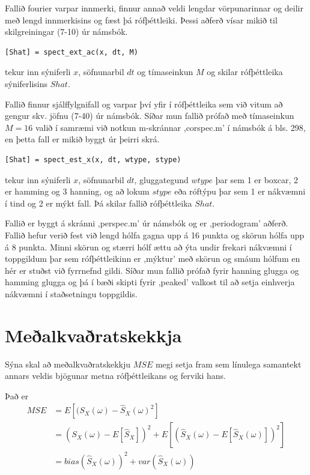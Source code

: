 \documentclass[11pt,a4paper]{article}
\begin{document}
Fallið fourier varpar innmerki, finnur annað veldi lengdar vörpunarinnar og deilir með lengd
innmerkisins og fæst þá rófþéttleiki. Þessi aðferð vísar mikið til skilgreiningar (7-10) úr námsbók.

\begin{verbatim}
[Shat] = spect_ext_ac(x, dt, M)
\end{verbatim}
tekur inn sýniferli $x$, söfnunarbil $dt$ og tímaseinkun $M$ og skilar
rófþéttleika sýniferlisins $Shat$.

Fallið finnur sjálffylgnifall og varpar því yfir í rófþéttleika sem við vitum að gengur skv. jöfnu (7-40) úr námsbók.
Síðar mun fallið prófað með tímaseinkun $M=16$ valið í samræmi við notkun m-skránnar ,corspec.m' í námsbók á bls. 298, 
en þetta fall er mikið byggt úr þeirri skrá.

\begin{verbatim}
[Shat] = spect_est_x(x, dt, wtype, stype)
\end{verbatim}
tekur inn sýniferli $x$, söfnunarbil $dt$, gluggategund $wtype$ þar 
sem 1 er boxcar, 2 er hamming og 3 hanning, og að lokum $stype$ 
eða róftýpu þar sem 1 er nákvæmni í tind og 2 er mýkt fall. Þá skilar
fallið rófþéttleika $Shat$.

Fallið er byggt á skránni ,perspec.m' úr námsbók og er ,periodogram' aðferð. Fallið hefur verið fest við lengd
hólfa gagna upp á 16 punkta og skörun hólfa upp á 8 punkta. Minni skörun og stærri hólf ættu að ýta undir frekari 
nákvæmni í toppgildum þar sem rófþéttleikinn er ,mýktur' með skörun og smáum hólfum en hér er stuðst við fyrrnefnd gildi.
Síðar mun fallið prófað fyrir hanning glugga og hamming glugga og þá í bæði skipti fyrir ,peaked' valkost til að setja
einhverja nákvæmni í staðsetningu toppgildis.
\section{Meðalkvaðratskekkja} \label{se:mse}
Sýna skal að meðalkvaðratskekkju $MSE$ megi setja fram sem línulega
samantekt annars veldis bjögunar metna rófþéttleikans og ferviki hans.

Það er 
\begin{align}
    MSE &= E[(S_X(\omega)-\hat{S}_X(\omega)^2] \label{eq:lok}\\
    &= (S_X(\omega)-E[\hat{S}_X])^2+E[(\hat{S}_X(\omega)-
    E[\hat{S}_X(\omega)])^2] \label{eq:tilbaka} \\
    &= bias(\hat{S}_X(\omega))^2+var(\hat{S}_X(\omega))
\end{align}
\end{document}
